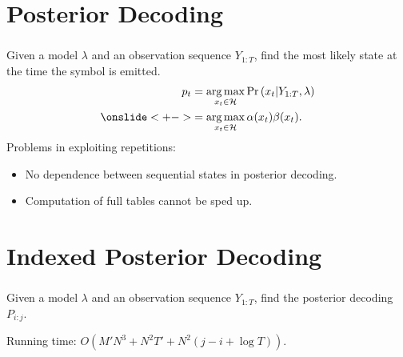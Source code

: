 \documentclass[english,notes]{beamer}
\DeclareMathOperator*{\argmax}{arg\,max}
\begin{document}
\section{Posterior Decoding}

\begin{frame}
  \frametitle{\insertsection}
  \onslide<+->
  Given a model $\lambda$ and an observation sequence $Y_{1:T}$,
  find the most likely state at the time the symbol is emitted.
  \begin{equation*}
    \begin{aligned}
      p_t & = \argmax_{x_t \in \mathcal{H}} \Pr \left(x_t | Y_{1:T}, \lambda \right) \\
          \onslide<+-> & = \argmax_{x_t \in \mathcal{H}} \alpha(x_t) \beta(x_t).
    \end{aligned}
  \end{equation*}
  \onslide<+->
  Problems in exploiting repetitions:
  \begin{itemize}
  \item<+-> No dependence between sequential states in posterior decoding.
  \item<+-> Computation of full tables cannot be sped up.
  \end{itemize}
\end{frame}

\section{Indexed Posterior Decoding}

\begin{frame}
  \frametitle{\insertsection}
  \onslide<+->
  Given a model $\lambda$ and an observation sequence $Y_{1:T}$, find the
  posterior decoding $P_{i:j}$.

  \begin{overlayarea}{\textwidth}{3cm}
    \only<+>{
      \begin{center}
        
      \end{center}
    }

    \only<+->{
      \begin{center}
        
      \end{center}
    }
  \end{overlayarea}

  \onslide<+-> {
    Running time: $O(M' N^3 + N^2 T' + N^2 (j - i + \log T))$.
  }
\end{frame}
\end{document}
